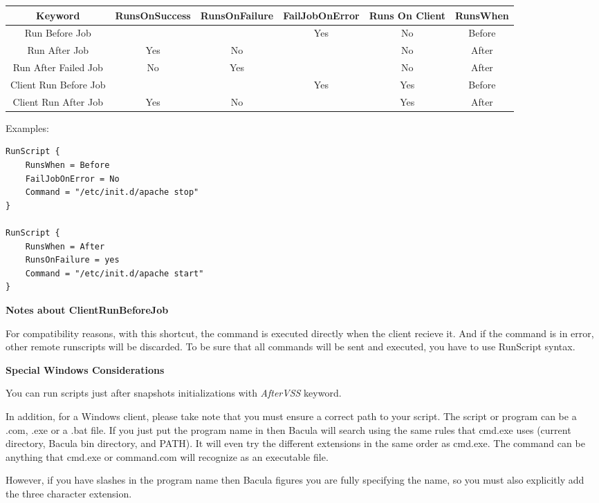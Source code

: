 \begin{description}
\begin{tabular}{|c|c|c|c|c|c}
Keyword & RunsOnSuccess & RunsOnFailure  & FailJobOnError & Runs On Client & RunsWhen  \\
\hline
Run Before Job         &        &       & Yes     & No     & Before \\
\hline
Run After Job          &  Yes   &   No  &         & No     & After  \\
\hline
Run After Failed Job   &  No    &  Yes  &         & No     & After  \\
\hline
Client Run Before Job  &        &       & Yes     & Yes    & Before \\
\hline
Client Run After Job   &  Yes   &   No  &         & Yes    & After  \\
\end{tabular}

Examples:
\begin{verbatim}
RunScript {
    RunsWhen = Before
    FailJobOnError = No
    Command = "/etc/init.d/apache stop"
}

RunScript {
    RunsWhen = After
    RunsOnFailure = yes
    Command = "/etc/init.d/apache start"
}
\end{verbatim}

   {\bf Notes about ClientRunBeforeJob}

   For compatibility reasons, with this shortcut, the command is executed
   directly when the client recieve it. And if the command is in error, other
   remote runscripts will be discarded. To be sure that all commands will be
   sent and executed, you have to use RunScript syntax.

   {\bf Special Windows Considerations}

   You can run scripts just after snapshots initializations with
   \textsl{AfterVSS} keyword.

   In addition, for a Windows client, please take
   note that you must ensure a correct path to your script.  The script or
   program can be a .com, .exe or a .bat file.  If you just put the program
   name in then Bacula will search using the same rules that cmd.exe uses
   (current directory, Bacula bin directory, and PATH).  It will even try the
   different extensions in the same order as cmd.exe.
   The command can be anything that cmd.exe or command.com will recognize
   as an executable file.  

   However, if you have slashes in the program name then Bacula figures you
   are fully specifying the name, so you must also explicitly add the three
   character extension.


\end{description}
